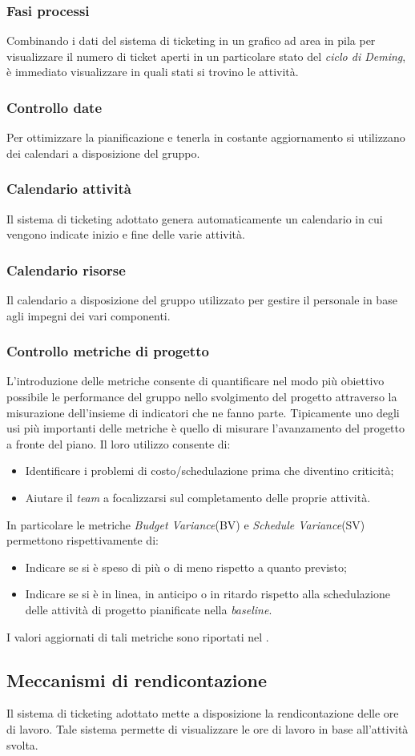		\subsubsection{Fasi processi}
		Combinando i dati del sistema di ticketing in un grafico ad area in pila per visualizzare il numero di ticket aperti in un particolare stato del \textit{ciclo di Deming}, è immediato visualizzare in quali stati si trovino le attività.
		\subsubsection{Controllo date} Per ottimizzare la pianificazione e tenerla in costante aggiornamento si utilizzano dei calendari a disposizione del gruppo.
		\subsubsection{Calendario attività}
		Il sistema di ticketing adottato genera automaticamente un calendario in cui vengono indicate inizio e fine delle varie attività.
		\subsubsection{Calendario risorse} Il calendario a disposizione del gruppo utilizzato per gestire il personale in base agli impegni dei vari componenti.
		\subsubsection{Controllo metriche di progetto} L'introduzione delle metriche consente di quantificare nel modo più obiettivo possibile le performance del gruppo nello svolgimento del progetto attraverso la misurazione dell'insieme di indicatori che ne fanno parte. Tipicamente uno degli usi più importanti delle metriche è quello di misurare l'avanzamento del progetto a fronte del piano. Il loro utilizzo consente di: 
		\begin{itemize}
			\item Identificare i problemi di costo/schedulazione prima che diventino criticità;
			\item Aiutare il \textit{team} a focalizzarsi sul completamento delle proprie attività.
		\end{itemize}
		In particolare le metriche \textit{Budget Variance}(BV) e \textit{Schedule Variance}(SV) permettono rispettivamente di:
		\begin{itemize}
			\item Indicare se si è speso di più o di meno rispetto a quanto previsto;
			\item Indicare se si è in linea, in anticipo o in ritardo rispetto alla schedulazione delle	attività di progetto pianificate nella \textit{baseline}. 
		\end{itemize}
		I valori aggiornati di tali metriche sono riportati nel \textit{\PdQ}.
	\subsection{Meccanismi di rendicontazione} Il sistema di ticketing adottato mette a disposizione la rendicontazione delle ore di lavoro. Tale sistema permette di visualizzare le ore di lavoro in base all'attività svolta.
